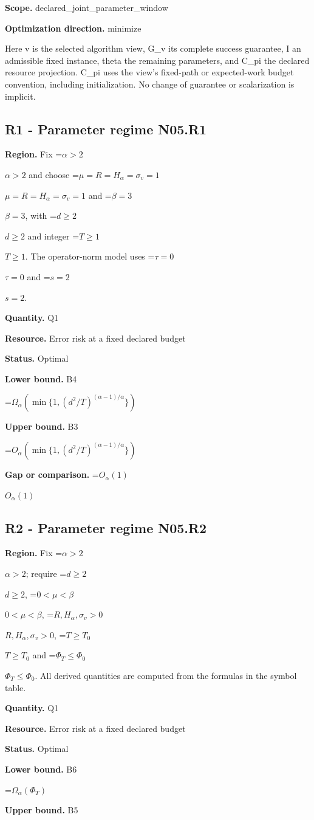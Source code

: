 \documentclass[10pt,a4paper]{article}
\newcommand{\AtlasMath}[1]{\par\begingroup\centering\setbox0=\hbox{$\displaystyle #1$}\ifdim\wd0>1.4\linewidth\typeout{ATLAS WIDE FORMULA: \the\wd0}\fi\ifdim\wd0>\linewidth\resizebox{\linewidth}{!}{\box0}\else\box0\fi\par\endgroup}
\newcommand{\AtlasInlineMath}[1]{\begingroup\setbox0=\hbox{$#1$}\ifdim\wd0>.4\linewidth\endgroup\AtlasMath{#1}\else\endgroup$#1$\fi}
\begin{document}
\textbf{Scope.} declared\_joint\_parameter\_window

\textbf{Optimization direction.} minimize

Here v is the selected algorithm view, G\_v its complete success guarantee, I an admissible fixed instance, theta the remaining parameters, and C\_pi the declared resource projection. C\_pi uses the view's fixed-path or expected-work budget convention, including initialization. No change of guarantee or scalarization is implicit.

\subsection{R1 - Parameter regime N05.R1}
\textbf{Region.} Fix \AtlasInlineMath{\alpha>2} and choose \AtlasInlineMath{\mu=R=H_\alpha=\sigma_v=1} and \AtlasInlineMath{\beta=3}, with \AtlasInlineMath{d\ge2} and integer \AtlasInlineMath{T\ge1}. The operator-norm model uses \AtlasInlineMath{\tau=0} and \AtlasInlineMath{s=2}.

\textbf{Quantity.} Q1

\textbf{Resource.} Error risk at a fixed declared budget

\textbf{Status.} Optimal

\textbf{Lower bound.} B4

\AtlasMath{\Omega_\alpha(\min\{1,(d^2/T)^{(\alpha-1)/\alpha}\})}
\textbf{Upper bound.} B3

\AtlasMath{O_\alpha(\min\{1,(d^2/T)^{(\alpha-1)/\alpha}\})}
\textbf{Gap or comparison.} \AtlasInlineMath{O_\alpha(1)}

\subsection{R2 - Parameter regime N05.R2}
\textbf{Region.} Fix \AtlasInlineMath{\alpha>2}; require \AtlasInlineMath{d\ge2}, \AtlasInlineMath{0<\mu<\beta}, \AtlasInlineMath{R,H_\alpha,\sigma_v>0}, \AtlasInlineMath{T\ge T_0} and \AtlasInlineMath{\Phi_T\le\Phi_0}. All derived quantities are computed from the formulas in the symbol table.

\textbf{Quantity.} Q1

\textbf{Resource.} Error risk at a fixed declared budget

\textbf{Status.} Optimal

\textbf{Lower bound.} B6

\AtlasMath{\Omega_\alpha(\Phi_T)}
\textbf{Upper bound.} B5
\end{document}
